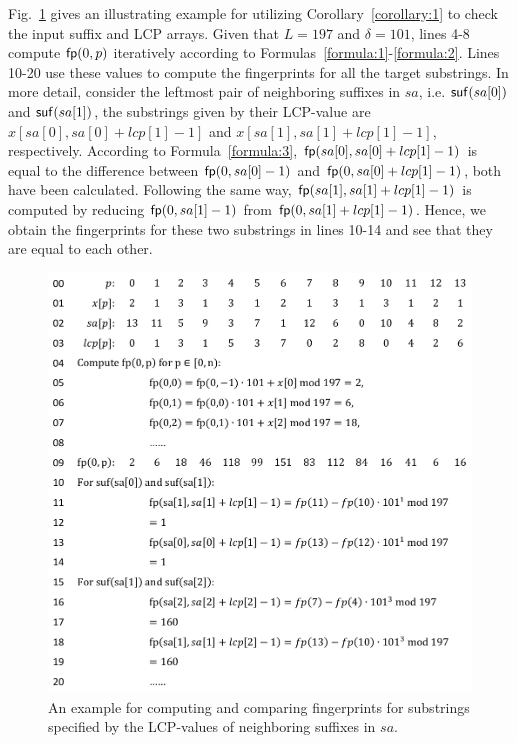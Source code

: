 \documentclass[10pt,journal,compsoc]{IEEEtran}
\begin{document}
Fig.~\ref{fig:example} gives an illustrating example for utilizing Corollary~\ref{corollary:1} to check the input suffix and LCP arrays. Given that $L = 197$ and $\delta = 101$, lines 4-8 compute ${\sf fp}(0, p)$ iteratively according to Formulas~\ref{formula:1}-\ref{formula:2}. Lines 10-20 use these values to compute the fingerprints for all the target substrings. In more detail, consider the leftmost pair of neighboring suffixes in $sa$, i.e. ${\sf suf}(sa[0])$ and ${\sf suf}(sa[1])$, the substrings given by their LCP-value are $x[sa[0], sa[0] + lcp[1] - 1]$ and $x[sa[1], sa[1] + lcp[1] - 1]$, respectively. According to Formula~\ref{formula:3}, ${\sf fp}(sa[0], sa[0] + lcp[1] - 1)$ is equal to the difference between ${\sf fp}(0, sa[0] - 1)$ and ${\sf fp}(0, sa[0] + lcp[1] - 1)$, both have been calculated. Following the same way, ${\sf fp}(sa[1], sa[1] + lcp[1] - 1)$ is computed by reducing ${\sf fp}(0, sa[1] - 1)$ from ${\sf fp}(0, sa[1] + lcp[1] - 1)$. Hence, we obtain the fingerprints for these two substrings in lines 10-14 and see that they are equal to each other.

\begin{figure}
	\centering
	
	\includegraphics[width = 0.9\columnwidth]{example}
	\caption{An example for computing and comparing fingerprints for substrings specified by the LCP-values of neighboring suffixes in $sa$. \label{fig:example}}	
\end{figure}
\end{document}
